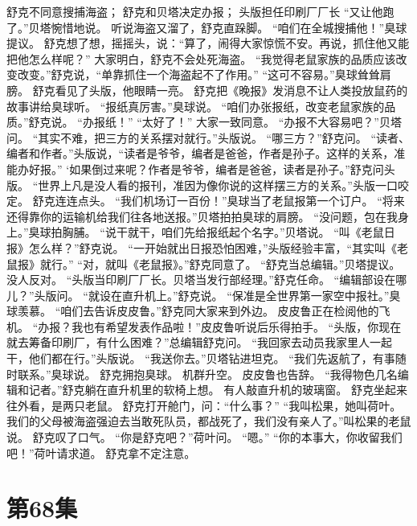 \documentclass[a4paper,12pt,UTF8,twoside]{ctexbook}
\begin{document}
        舒克不同意搜捕海盗； 
        舒克和贝塔决定办报； 
        头版担任印刷厂厂长   
        “又让他跑了。”贝塔惋惜地说。 
        听说海盗又溜了，舒克直跺脚。 
        “咱们在全城搜捕他！”臭球提议。 
        舒克想了想，摇摇头，说：“算了，闹得大家惊慌不安。再说，抓住他又能把他怎么样呢？” 
        大家明白，舒克不会处死海盗。 
        “我觉得老鼠家族的品质应该改变改变。”舒克说，“单靠抓住一个海盗起不了作用。” 
        “这可不容易。”臭球耸耸肩膀。 
        舒克看见了头版，他眼睛一亮。 
        舒克把《晚报》发消息不让人类投放鼠药的故事讲给臭球听。 
        “报纸真厉害。”臭球说。 
        “咱们办张报纸，改变老鼠家族的品质。”舒克说。 
        “办报纸！” 
        “太好了！” 
        大家一致同意。 
        “办报不大容易吧？”贝塔问。 
        “其实不难，把三方的关系摆对就行。”头版说。 
        “哪三方？”舒克问。 
        “读者、编者和作者。”头版说，“读者是爷爷，编者是爸爸，作者是孙子。这样的关系，准能办好报。” 
        ‘如果倒过来呢？作者是爷爷，编者是爸爸，读者是孙子。”舒克问头版。 
        “世界上凡是没人看的报刊，准因为像你说的这样摆三方的关系。”头版一口咬定。 
        舒克连连点头。 
        “我们机场订一百份！”臭球当了老鼠报第一个订户。 
        “将来还得靠你的运输机给我们往各地送报。”贝塔拍拍臭球的肩膀。 
        “没问题，包在我身上。”臭球拍胸脯。 
        “说干就干，咱们先给报纸起个名字。”贝塔说。 
        “叫《老鼠日报》怎么样？”舒克说。 
        “一开始就出日报恐怕困难，”头版经验丰富，“其实叫《老鼠报》就行。” 
        “对，就叫《老鼠报》。”舒克同意了。 
        “舒克当总编辑。”贝塔提议。 
        没人反对。 
        “头版当印刷厂厂长。贝塔当发行部经理。”舒克任命。 
        “编辑部设在哪儿？”头版问。 
        “就设在直升机上。”舒克说。 
        “保准是全世界第一家空中报社。”臭球羡慕。 
        “咱们去告诉皮皮鲁。”舒克同大家来到外边。 
        皮皮鲁正在检阅他的飞机。 
        “办报？我也有希望发表作品啦！”皮皮鲁听说后乐得拍手。 
        “头版，你现在就去筹备印刷厂，有什么困难？”总编辑舒克问。 
        “我回家去动员我家里人一起干，他们都在行。”头版说。 
        “我送你去。”贝塔钻进坦克。 
        “我们先返航了，有事随时联系。”臭球说。 
        舒克拥抱臭球。 
        机群升空。 
        皮皮鲁也告辞。 
        “我得物色几名编辑和记者。”舒克躺在直升机里的软椅上想。 
        有人敲直升机的玻璃窗。 
        舒克坐起来往外看，是两只老鼠。 
        舒克打开舱门，问：“什么事？” 
        “我叫松果，她叫荷叶。我们的父母被海盗强迫去当敢死队员，都战死了，我们没有亲人了。”叫松果的老鼠说。 
        舒克叹了口气。 
        “你是舒克吧？”荷叶问。 
        “嗯。” 
        “你的本事大，你收留我们吧！”荷叶请求道。 
        舒克拿不定注意。   \chapter{第68集} 
\end{document}
